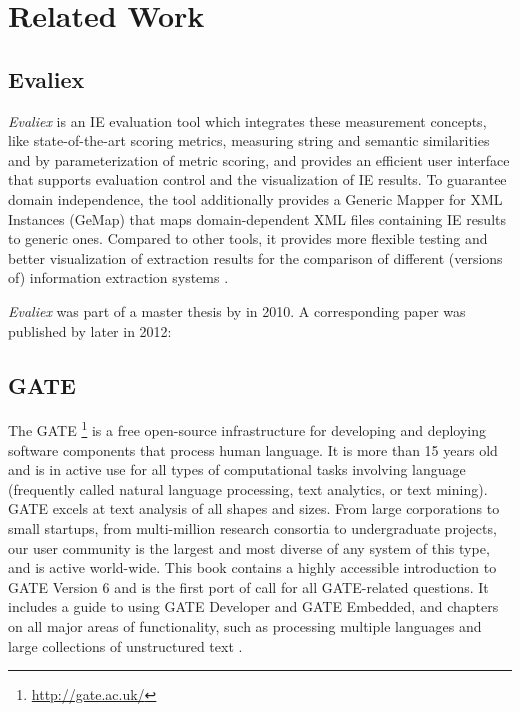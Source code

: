 \section{Related Work}
\label{sec:related-work}

\subsection{Evaliex}
\textit{Evaliex} is an \gls{IE} evaluation tool which integrates these measurement concepts, like state-of-the-art scoring metrics, measuring string and semantic similarities and by parameterization of metric scoring, and provides an efficient user interface that supports evaluation control and the visualization of \gls{IE} results. To guarantee domain independence, the tool additionally provides a Generic Mapper for XML Instances (GeMap) that maps domain-dependent XML files containing \gls{IE} results to generic ones. Compared to other tools, it provides more flexible testing and better visualization of extraction results for the comparison of different (versions of) information extraction systems \cite{Feilmayr:2012}.

\textit{Evaliex}  was part of a master thesis by \citeauthor{Linsmayr:2010} in 2010. A corresponding paper was published by \citeauthor{Feilmayr:2012} later in 2012:

\begin{quote}
\end{quote}

\begin{quote}
\end{quote}

\subsection{GATE}
The \gls{GATE} \footnote{\url{http://gate.ac.uk/}} is a free open-source infrastructure for developing and deploying software components that process human language. It is more than 15 years old and is in active use for all types of computational tasks involving language (frequently called natural language processing, text analytics, or text mining). \gls{GATE} excels at text analysis of all shapes and sizes. From large corporations to small startups, from multi-million research consortia to undergraduate projects, our user community is the largest and most diverse of any system of this type, and is active world-wide. This book contains a highly accessible introduction to \gls{GATE} Version 6 and is the first port of call for all \gls{GATE}-related questions. It includes a guide to using \gls{GATE} Developer and \gls{GATE} Embedded, and chapters on all major areas of functionality, such as processing multiple languages and large collections of unstructured text \cite{Cunningham:2011}.

